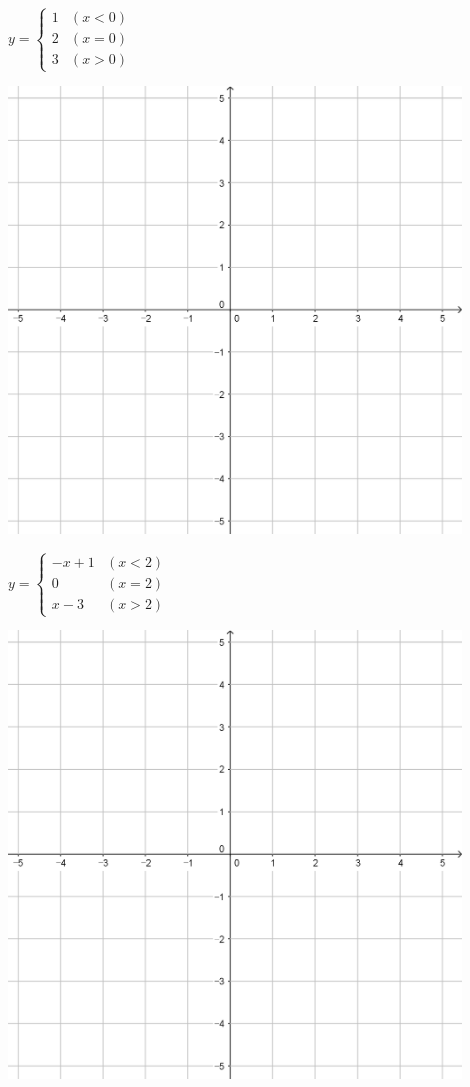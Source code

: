 \documentclass{oblivoir}
\begin{document}
\clearpage
\begin{minipage}{0.45\textwidth}\centering
\(y=\begin{cases}1&(x<0)\\2&(x=0)\\3&(x>0)\end{cases}\)
\par\bigskip\includegraphics[width=0.9\textwidth]{55}
\end{minipage}
\begin{minipage}{0.45\textwidth}\centering
\(y=\begin{cases}-x+1&(x<2)\\0&(x=2)\\x-3&(x>2)\end{cases}\)
\par\bigskip\includegraphics[width=0.9\textwidth]{55}
\end{minipage}\bigskip\bigskip\par
\end{document}

